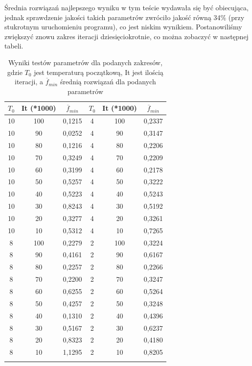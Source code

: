 \documentclass[twoside]{projektInzynierskiMS1}
\newcommand{\si}{ś}
\begin{document}
Średnia rozwiązań najlepszego wyniku w tym te\si cie wydawała się być obiecująca, jednak sprawdzenie jako\si ci takich parametrów zwróciło jako\si ć równą 34\% (przy stukrotnym uruchomieniu programu), co jest niskim wynikiem. Postanowili\si my zwiększyć znowu zakres iteracji dziesięciokrotnie, co można zobaczyć w następnej tabeli.

\begin{table}[htbp]\centering
\def\sym#1{\ifmmode^{#1}\else\(^{#1}\)\fi}
\caption{Wyniki testów parametrów dla podanych zakresów, gdzie $T_0$ jest temperaturą początkową, It jest ilo\si cią iteracji, a $\overline{f}_{min}$ \si rednią rozwiązań dla podanych parametrów}
\begin{tabular}{|c|c|c||c|c|c|} 
                  \hline
                   \textbf{$T_0$}
                  & \textbf{It (*1000)}
                  &\textbf{$\overline{f}_{min}$} 
& \textbf{$T_0$}
 & \textbf{It (*1000)}
 &\textbf{$\overline{f}_{min}$} \\ \hline
10 & 100 & 0,1215 & 4 & 100 & 0,2337 \\ \hline
10 & 90 & 0,0252 & 4 & 90 & 0,3147 \\ \hline
10 & 80 & 0,1216 & 4 & 80 & 0,2206 \\ \hline
10 & 70 & 0,3249& 4 & 70 & 0,2209 \\ \hline 
10 & 60 & 0,3199 & 4 & 60 & 0,2178 \\ \hline 
10 & 50 & 0,5257 & 4 & 50 & 0,3222 \\ \hline
10 & 40 & 0,5223 & 4 & 40 & 0,5243 \\ \hline 
10 & 30 & 0,8243 & 4 & 30 & 0,5192 \\ \hline
10 & 20 & 0,3277 & 4 & 20 & 0,3261 \\ \hline 
10 & 10 & 0,5312 & 4 & 10 & 0,7265 \\ \Xhline{3\arrayrulewidth}

8 & 100 & 0,2279 & 2 & 100 & 0,3224 \\ \hline 
8 & 90 & 0,4161 & 2 & 90 & 0,6167 \\ \hline 
8 & 80 & 0,2257 & 2 & 80 & 0,2266 \\ \hline 
8 & 70 & 0,2200 & 2 & 70 & 0,3247 \\ \hline 
8 & 60 & 0,6255 & 2 & 60 & 0,5264 \\ \hline 
8 & 50 & 0,4257 & 2 & 50 & 0,3248 \\ \hline 
8 & 40 & 0,1310 & 2 & 40 & 0,4396 \\ \hline
8 & 30 & 0,5167 & 2 & 30 & 0,6237 \\ \hline
8 & 20 & 0,8323 & 2 & 20 & 0,4180 \\ \hline
8 & 10 & 1,1295 & 2 & 10 & 0,8205 \\ \Xhline{3\arrayrulewidth}


\end{tabular}
\end{table}
\end{document}
